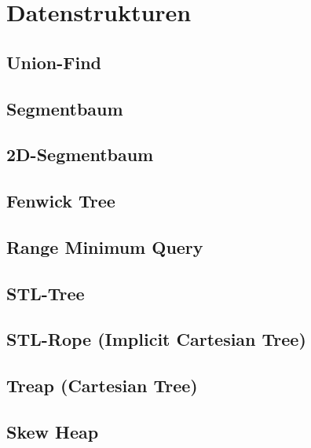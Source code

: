 \section{Datenstrukturen}

\subsection{Union-Find}


\subsection{Segmentbaum}


\subsection{2D-Segmentbaum}


\subsection{Fenwick Tree}



\subsection{Range Minimum Query}


\subsection{STL-Tree}


\subsection{STL-Rope (Implicit Cartesian Tree)}


\subsection{Treap (Cartesian Tree)}


\subsection{Skew Heap}

